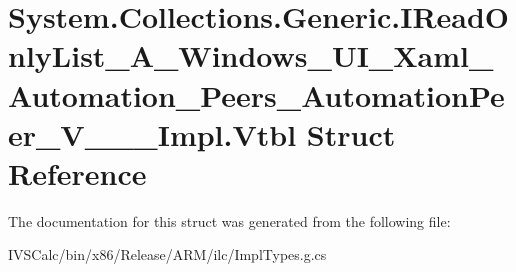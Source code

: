 \hypertarget{struct_system_1_1_collections_1_1_generic_1_1_i_read_only_list___a___windows___u_i___xaml___autoe78e64e2d6a30ac8fae708bd8a27e166}{}\section{System.\+Collections.\+Generic.\+I\+Read\+Only\+List\+\_\+\+A\+\_\+\+Windows\+\_\+\+U\+I\+\_\+\+Xaml\+\_\+\+Automation\+\_\+\+Peers\+\_\+\+Automation\+Peer\+\_\+\+V\+\_\+\+\_\+\+\_\+\+Impl.\+Vtbl Struct Reference}
\label{struct_system_1_1_collections_1_1_generic_1_1_i_read_only_list___a___windows___u_i___xaml___autoe78e64e2d6a30ac8fae708bd8a27e166}


The documentation for this struct was generated from the following file\+:\begin{DoxyCompactItemize}
\item 
I\+V\+S\+Calc/bin/x86/\+Release/\+A\+R\+M/ilc/Impl\+Types.\+g.\+cs\end{DoxyCompactItemize}
